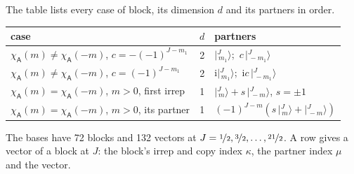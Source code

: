 \documentclass[10pt,a4paper]{article}
\numberwithin{equation}{section}
\newcommand{\grp}[1]{\mathsf{#1}}
\newcommand{\iunit}{\mathrm{i}}
\newcommand{\chiA}{\chi_{\grp{A}}}
\newcommand{\mult}{\kappa}
\newcommand{\intx}{\mu}
\newcommand{\jm}[2]{\bigl\lvert{}^{#1}_{\,#2}\bigr\rangle}
\begin{document}
\leavevmode\label{n:head.case}\label{n:head.partners}The table lists every case of block, its dimension $d$ and its partners in order.
\begin{center}\begin{tabular}{@{}lrl@{}}\toprule
case & $d$ & partners\\\midrule
$\chiA(m) \ne \chiA(-m)$, $c = -(-1)^{J-m_1}$ & 2 & $\jm{J}{m_1}$;\ $c\,\jm{J}{-m_1}$\\
$\chiA(m) \ne \chiA(-m)$, $c = (-1)^{J-m_1}$ & 2 & $\iunit\jm{J}{m_1}$;\ $\iunit c\,\jm{J}{-m_1}$\\
$\chiA(m) = \chiA(-m)$, $m > 0$, first irrep & 1 & $\jm{J}{m} + s\,\jm{J}{-m}$, $s = \pm1$\\
$\chiA(m) = \chiA(-m)$, $m > 0$, its partner & 1 & $(-1)^{J-m}(s\,\jm{J}{m} + \jm{J}{-m})$\\
\bottomrule\end{tabular}\end{center}
The bases have 72 blocks and 132 vectors at $J = \nicefrac{1}{2}, \nicefrac{3}{2}, \dots, \nicefrac{21}{2}$. \label{n:head.vector}A row gives a vector of a block at $J$: the block's irrep and copy index $\mult$, the partner index $\intx$ and the vector.
\end{document}

